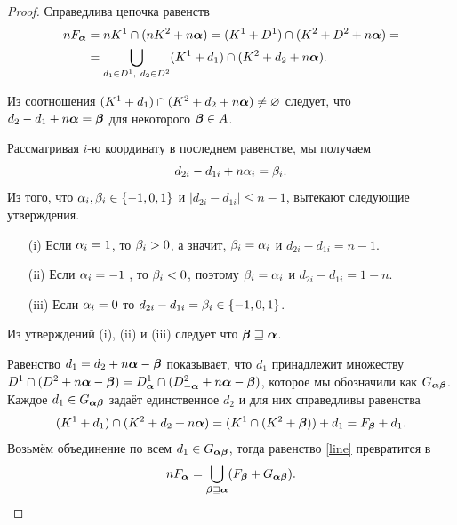 \begin{proof}
Справедлива цепочка равенств
\begin{equation}\label{line}
\begin{split}
nF_{\bm{\alpha}} &= nK^1\cap(nK^2+n{\bm{\alpha}})=(K^1+D^1)\cap(K^2+D^2+n{\bm{\alpha}})=\\
        &= \bigcup\limits_{d_1\in D^1,\ d_2\in D^2}(K^1+d_1)\cap (K^2+d_2+n{\bm{\alpha}}).
\end{split}
\end{equation}

Из соотношения $(K^1+d_1)\cap (K^2+d_2+n{\bm{\alpha}})\neq\varnothing$ следует, что \\
$d_2-d_1+n{\bm{\alpha}}={\bm{\beta}}$ для некоторого ${\bm{\beta}}\in A$.

Рассматривая $i$-ю координату в последнем равенстве, мы получаем
$$d_{2i}-d_{1i}+n\alpha_i=\beta_i.$$ 
Из того, что $\alpha_i,\beta_i\in\{-1,0,1\}$ и $|d_{2i}-d_{1i}|\le n-1$, вытекают следующие утверждения.

\begin{itemize}[nolistsep]
 \item[(i)] Если $\alpha_i=1$, то $\beta_i>0$, а значит, $\beta_i=\alpha_i$ и $d_{2i}-d_{1i}=n-1$.
 \item[(ii)] Если $\alpha_i=-1$ , то $\beta_i<0$, поэтому $\beta_i=\alpha_i$ и $d_{2i}-d_{1i}=1-n$.
 \item[(iii)] Если $\alpha_i=0$ то $d_{2i}-d_{1i}=\beta_i\in\{-1,0,1\}$.
\end{itemize} 
\medskip

Из утверждений (i), (ii) и (iii) следует что ${\bm{\beta}}\sqsupseteq{\bm{\alpha}}$.

Равенство $d_1=d_2+n{\bm{\alpha}}-{\bm{\beta}}$ показывает, что $d_1$ принадлежит множеству $D^1\cap(D^2+n{\bm{\alpha}}-{\bm{\beta}})=D^1_{\bm{\alpha}}\cap(D^2_{-{\bm{\alpha}}}+n{\bm{\alpha}}-{\bm{\beta}})$, которое мы обозначили как $G_{{\bm{\alpha}}{\bm{\beta}}}$.
Каждое $d_1\in G_{{\bm{\alpha}}{\bm{\beta}}}$ задаёт единственное $d_2$ и для них справедливы равенства 
$$(K^1+d_1)\cap (K^2+d_2+n{\bm{\alpha}})= (K^1\cap(K^2+{\bm{\beta}}))+d_1= F_{\bm{\beta}}+d_1.$$ 
Возьмём объединение по всем $d_1\in G_{{\bm{\alpha}}{\bm{\beta}}}$, тогда равенство \eqref{line} превратится в $$nF_{\bm{\alpha}}= \bigcup\limits_{{\bm{\beta}}\sqsupseteq{\bm{\alpha}}} (F_{\bm{\beta}}+G_{{\bm{\alpha}}{\bm{\beta}}}).$$
\end{proof}

% 
% 

